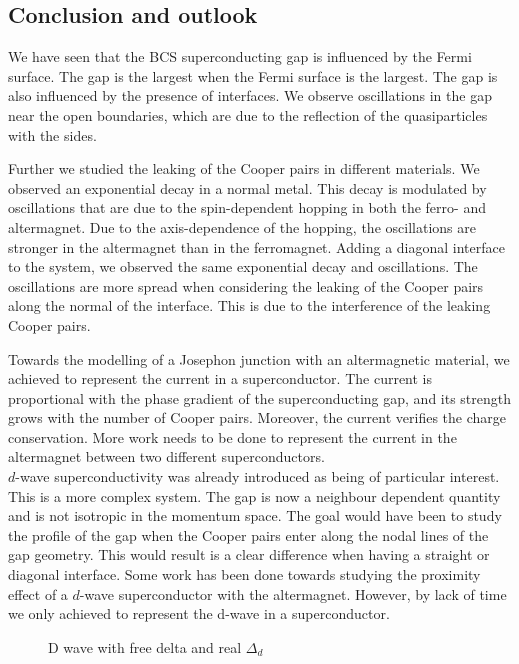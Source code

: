 \documentclass[..\main.tex]{subfile}
\begin{document}
\subsection{Conclusion and outlook}
We have seen that the BCS superconducting gap is influenced by the Fermi surface. The gap is the largest when the Fermi surface is the largest.
The gap is also influenced by the presence of interfaces. We observe oscillations in the gap near the open boundaries, which are due to the reflection
of the quasiparticles with the sides.

Further we studied the leaking of the Cooper pairs in different materials. We observed an exponential decay in a normal metal.
This decay is modulated by oscillations that are due to the spin-dependent hopping in both the ferro- and altermagnet.
Due to the axis-dependence of the hopping, the oscillations are stronger in the altermagnet than in the ferromagnet.
Adding a diagonal interface to the system, we observed the same exponential decay and oscillations. The oscillations are more spread when considering
the leaking of the Cooper pairs along the normal of the interface. This is due to the interference of the leaking Cooper pairs.

Towards the modelling of a Josephon junction with an altermagnetic material, we achieved to represent the current in a superconductor.
The current is proportional with the phase gradient of the superconducting gap, and its strength grows with the number of Cooper pairs.
Moreover, the current verifies the charge conservation.
More work needs to be done to represent the current in the altermagnet between two different superconductors.\\

$d$-wave superconductivity was already introduced as being of particular interest. This is a more complex system.
The gap is now a neighbour dependent quantity and is not isotropic in the momentum space. The goal would have been 
to study the profile of the gap when the Cooper pairs enter along the nodal lines of the gap geometry. This
would result is a clear difference when having a straight or diagonal interface. 
 Some work has been done towards studying the
proximity effect of a $d$-wave superconductor with the altermagnet. However, by lack of time we only achieved to represent the d-wave in a superconductor.\\

\begin{figure}[H]
    
    \caption{D wave with free delta and real $\Delta_d$}
\end{figure}
\end{document}

